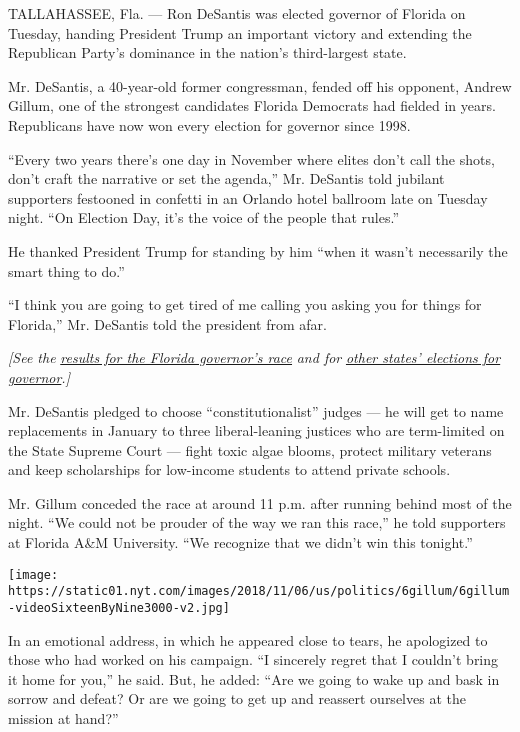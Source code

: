 TALLAHASSEE, Fla. --- Ron DeSantis was elected governor of Florida on
Tuesday, handing President Trump an important victory and extending the
Republican Party's dominance in the nation's third-largest state.

Mr. DeSantis, a 40-year-old former congressman, fended off his opponent,
Andrew Gillum, one of the strongest candidates Florida Democrats had
fielded in years. Republicans have now won every election for governor
since 1998.

``Every two years there's one day in November where elites don't call
the shots, don't craft the narrative or set the agenda,'' Mr. DeSantis
told jubilant supporters festooned in confetti in an Orlando hotel
ballroom late on Tuesday night. ``On Election Day, it's the voice of the
people that rules.''

He thanked President Trump for standing by him ``when it wasn't
necessarily the smart thing to do.''

``I think you are going to get tired of me calling you asking you for
things for Florida,'' Mr. DeSantis told the president from afar.

\emph{{[}See the}
\href{https://www.nytimes.com/elections/results/florida-governor?action=click\&module=Intentional\&pgtype=Article}{\emph{results
for the Florida governor's race}} \emph{and for}
\href{https://www.nytimes.com/interactive/2018/11/06/us/elections/results-governor-elections.html?action=click\&module=Intentional\&pgtype=Article}{\emph{other
states' elections for governor}}\emph{.{]}}

Mr. DeSantis pledged to choose ``constitutionalist'' judges --- he will
get to name replacements in January to three liberal-leaning justices
who are term-limited on the State Supreme Court --- fight toxic algae
blooms, protect military veterans and keep scholarships for low-income
students to attend private schools.

Mr. Gillum conceded the race at around 11 p.m. after running behind most
of the night. ``We could not be prouder of the way we ran this race,''
he told supporters at Florida A\&M University. ``We recognize that we
didn't win this tonight.''

\texttt{[image: https://static01.nyt.com/images/2018/11/06/us/politics/6gillum/6gillum-videoSixteenByNine3000-v2.jpg]}

In an emotional address, in which he appeared close to tears, he
apologized to those who had worked on his campaign. ``I sincerely regret
that I couldn't bring it home for you,'' he said. But, he added: ``Are
we going to wake up and bask in sorrow and defeat? Or are we going to
get up and reassert ourselves at the mission at hand?''


